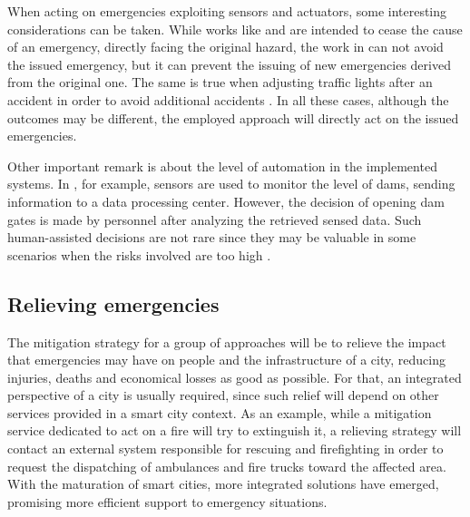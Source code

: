 \begin{refsection}
When acting on emergencies exploiting sensors and actuators, some interesting considerations can be taken. While works like \cite{SultanMahmud2017} and \cite{mitigationAct1} are intended to cease the cause of an emergency, directly facing the original hazard, the work in \cite{iotEarthquake2} can not avoid the issued emergency, but it can prevent the issuing of new emergencies derived from the original one. The same is true when adjusting traffic lights after an accident in order to avoid additional accidents \cite{mitigationITS1,rego2018software}. In all these cases, although the outcomes may be different, the employed approach will directly act on the issued emergencies.

Other important remark is about the level of automation in the implemented systems. In \cite{iotFlood2}, for example, sensors are used to monitor the level of dams, sending information to a data processing center. However, the decision of opening dam gates is made by personnel after analyzing the retrieved sensed data. Such human-assisted decisions are not rare since they may be valuable in some scenarios when the risks involved are too high \cite{humanAssisted1}.

\subsection{Relieving emergencies}

The mitigation strategy for a group of approaches will be to relieve the impact that emergencies may have on people and the infrastructure of a city, reducing injuries, deaths and economical losses as good as possible. For that, an integrated perspective of a city is usually required, since such relief will depend on other services provided in a smart city context. As an example, while a mitigation service dedicated to act on a fire will try to extinguish it, a relieving strategy will contact an external system responsible for rescuing and firefighting in order to request the dispatching of ambulances and fire trucks toward the affected area. With the maturation of smart cities, more integrated solutions have emerged, promising more efficient support to emergency situations. 


\end{refsection}

